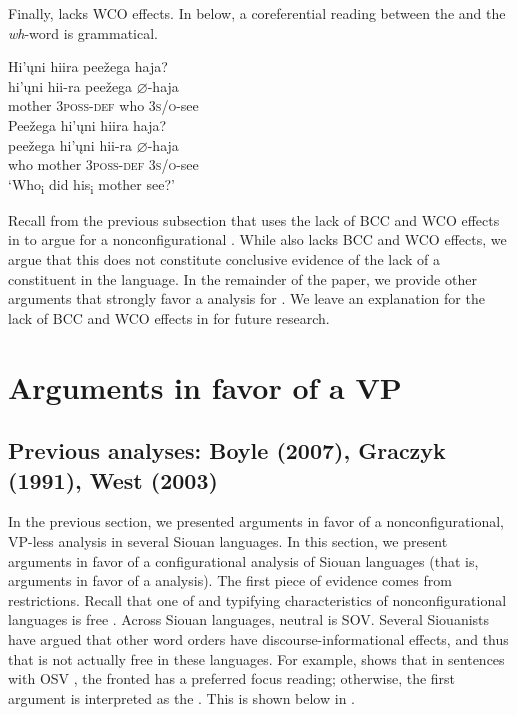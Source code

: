 \documentclass[output=paper]{LSP/langsci}
\begin{document}
Finally,  lacks WCO effects. In  below, a coreferential reading between the  and the  \textit{wh}-word is grammatical.

\begin{exe}
\ex\label{ex:jrs:21}
\begin{xlist} 	
\ex
\glll Hi'\k{u}ni		hiira					pee\v{z}ega		haja? \\
hi'\k{u}ni		hii-ra 			pee\v{z}ega		$\varnothing$-haja \\
	mother		3\textsc{poss-def}		who	\textsc{3s/o}-see \\ 
    
\ex
\glll Pee\v{z}ega 	hi'\k{u}ni 		hiira		haja?\\
pee\v{z}ega 	hi'\k{u}ni 		hii-ra 		$\varnothing$-haja \\
	who 	mother 	3\textsc{poss-def} 	\textsc{3s/o}-see \\
\trans `Who\textsubscript{i} did his\textsubscript{i} mother see?'
\end{xlist}
\end{exe}

Recall from the previous subsection that \citet{VanValin1985,VanValin1987} uses the lack of BCC and WCO effects in  to argue for a nonconfigurational . While  also lacks BCC and WCO effects, we argue that this does not constitute conclusive evidence of the lack of a  constituent in the language. In the remainder of the paper, we provide other arguments that strongly favor a  analysis for . We leave an explanation for the lack of BCC and WCO effects in  for future research.

\section{Arguments in favor of a VP}\label{sec:jrs:3}

\subsection{Previous analyses: Boyle (2007), Graczyk (1991), West (2003)}

In the previous section, we presented arguments in favor of a nonconfigurational, VP-less analysis in several Siouan languages.  In this section, we present arguments in favor of a configurational analysis of Siouan languages (that is, arguments in favor of a  analysis).  The first piece of evidence comes from  restrictions. Recall that one of  and  typifying characteristics of nonconfigurational languages is free .  Across Siouan languages, neutral  is SOV.  Several Siouanists have argued that other word orders have discourse-informational effects, and thus that  is not actually free in these languages. For example, \citet{West2003} shows that in  sentences with OSV , the fronted  has a preferred focus reading; otherwise, the first argument is interpreted as the . This is shown below in . 
\end{document}
